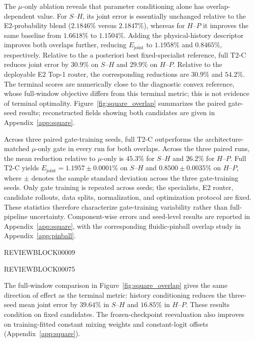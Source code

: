 \documentclass{article}
\begin{document}
The $\mu$-only ablation reveals that parameter conditioning alone has overlap-dependent value. For $S$--$H$, its joint error is essentially unchanged relative to the E2-probability blend ($2.1846\%$ versus $2.1847\%$), whereas for $H$--$P$ it improves the same baseline from $1.6618\%$ to $1.1504\%$. Adding the physical-history descriptor improves both overlaps further, reducing $E_{\mathrm{joint}}$ to $1.1958\%$ and $0.8465\%$, respectively. Relative to the a posteriori best fixed-specialist reference, full T2-C reduces joint error by $30.9\%$ on $S$--$H$ and $29.9\%$ on $H$--$P$. Relative to the deployable E2 Top-1 router, the corresponding reductions are $30.9\%$ and $54.2\%$. The terminal scores are numerically close to the diagnostic convex reference, whose full-window objective differs from this terminal metric; this is not evidence of terminal optimality. Figure~\ref{fig:square_overlap} summarizes the paired gate-seed results; reconstructed fields showing both candidates are given in Appendix~\ref{app:square}.

Across three paired gate-training seeds, full T2-C outperforms the architecture-matched $\mu$-only gate in every run for both overlaps.
Across the three paired runs, the mean reduction relative to $\mu$-only is $45.3\%$ for $S$--$H$ and $26.2\%$ for $H$--$P$. Full T2-C yields
$E_{\mathrm{joint}}=1.1957\pm0.0001\%$ on $S$--$H$ and $0.8500\pm0.0035\%$ on $H$--$P$, where $\pm$ denotes the sample standard
deviation across the three gate-training seeds. Only gate training is repeated across seeds; the specialists, E2 router, candidate rollouts, data splits, normalization, and optimization protocol are fixed. These statistics therefore characterize gate-training variability rather than full-pipeline uncertainty. Component-wise errors and seed-level results are reported in Appendix~\ref{app:square}, with the corresponding fluidic-pinball overlap study in Appendix~\ref{app:pinball}.


\par


REVIEWBLOCK00009


\par




REVIEWBLOCK00075



The full-window comparison in Figure~\ref{fig:square_overlap} gives the
same direction of effect as the terminal metric: history conditioning
reduces the three-seed mean joint error by $39.64\%$ in $S$--$H$ and
$16.85\%$ in $H$--$P$. These results condition on fixed candidates.
The frozen-checkpoint reevaluation also improves on training-fitted
constant mixing weights and constant-logit offsets
(Appendix~\ref{app:square}).
\end{document}
